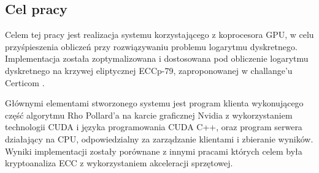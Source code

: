 \subsection{Cel pracy}
Celem tej pracy jest realizacja systemu korzystającego z koprocesora GPU,
w celu przyśpieszenia obliczeń przy
rozwiązywaniu problemu logarytmu dyskretnego.
Implementacja została zoptymalizowana i dostosowana pod obliczenie logarytmu
dyskretnego na krzywej eliptycznej ECCp-79, zaproponowanej w challange'u Certicom \cite{certicom-challange}.
\par
Głównymi elementami stworzonego systemu
jest program klienta wykonującego część algorytmu Rho Pollard'a na karcie graficznej Nvidia
z wykorzystaniem technologii CUDA i języka programowania CUDA C++,
oraz program serwera działający na CPU, odpowiedzialny za zarządzanie klientami i zbieranie wyników.
 Wyniki implementacji zostały porównane z innymi pracami
których celem była kryptoanaliza ECC z wykorzystaniem akceleracji sprzętowej.